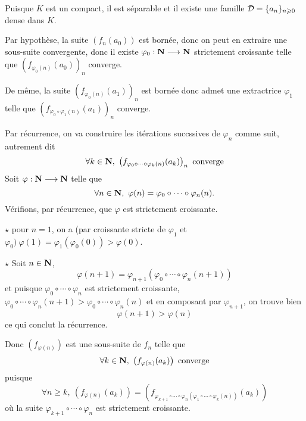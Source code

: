 \documentclass[a4paper,11pt, twoside]{article}
\begin{document}
\begin{Proof}
  Puisque $K$ est un compact, il est séparable et il existe une famille $\mathcal D=\{a_n\}_{n\geqslant 0}$ dense dans $K$. 
  
  Par hypothèse, la suite $\left(f_n(a_0)\right)$ est bornée, donc on peut en extraire une sous-suite convergente, donc il existe $\varphi_0:\mathbf N\longrightarrow\mathbf N$ strictement croissante telle que $\left(f_{\varphi_0(n)}(a_0)\right)_n$ converge.

  De même, la suite $\left(f_{\varphi_0(n)}(a_1)\right)_n$ est bornée donc admet une extractrice $\varphi_1$ telle que $\left(f_{\varphi_0\circ\varphi_1(n)}(a_1)\right)_n$ converge.

  Par récurrence, on va construire les itérations succssives de $\varphi_n$ comme suit, autrement dit 
  $$\forall k\in\N,\ \left(f_{\varphi_0\circ\cdots\circ\varphi_k(n)}(a_k)\right)_n\text{ converge}$$
  Soit $\varphi:\mathbf N\longrightarrow\mathbf N$ telle que 
  $$\forall n\in\N,\ \varphi(n)=\varphi_0\circ\cdots\circ\varphi_n(n).$$
  Vérifions, par récurrence, que $\varphi$ est strictement croissante. 
    
  $\star$ pour $n=1$, on a (par croissante stricte de $\varphi_1$ et $\varphi_0)\ \varphi(1)=\varphi_1(\varphi_0(0))>\varphi(0).$

  $\star$ Soit $n\in\mathbf N$,
  $$\varphi(n+1)=\varphi_{n+1}(\varphi_0\circ\cdots\circ\varphi_n(n+1))$$
  et puisque $\varphi_0\circ\cdots\circ\varphi_n$ est strictement croissante, $\varphi_0\circ\cdots\circ\varphi_n(n+1)>\varphi_0\circ\cdots\circ\varphi_n(n)$ et en composant par $\varphi_{n+1}$, on trouve bien
  $$\varphi(n+1)>\varphi(n)$$
  ce qui conclut la récurrence.

  Donc $\left(f_{\varphi(n)}\right)$ est une sous-suite de $f_n$ telle que 
  $$\forall k\in\N,\ \left(f_{\varphi(n)}(a_k)\right)\text{ converge}$$
  puisque 
  $$\forall n\geqslant k,\ \left(f_{\varphi(n)}(a_k)\right)=\left(f_{\varphi_{k+1}\circ\cdots\circ\varphi_n(\varphi_1\circ\cdots\circ\varphi_k(n))}(a_k)\right)$$
  où la suite $\varphi_{k+1}\circ\cdots\circ\varphi_n$ est strictement croissante.


\end{Proof}
\end{document}
